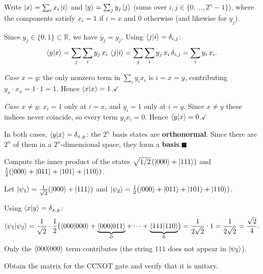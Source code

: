\documentclass{ceri/sty/rapport}
\newcounter{exercice}[section]
\begin{document}
\begin{solution}
Write $\ket{x}=\sum_{i}x_i\ket{i}$ and $\ket{y}=\sum_{j}y_j\ket{j}$
(sums over $i,j\in\{0,\ldots,2^n-1\}$),
where the components satisfy $x_i=1$ if $i=x$ and $0$ otherwise (and likewise for $y_j$).

Since $y_j\in\{0,1\}\subset\mathbb{R}$, we have $\bar{y}_j=y_j$.
Using $\braket{j|i}=\delta_{i,j}$:
\[
  \braket{y|x}
  =\sum_{j}\sum_{i}y_j\,x_i\,\braket{j|i}
  =\sum_{j}\sum_{i}y_j\,x_i\,\delta_{i,j}
  =\sum_{i}y_i\,x_i.
\]

\textit{Case $x=y$}: the only nonzero term in $\sum_i y_i x_i$ is $i=x=y$,
contributing $y_x\cdot x_x=1\cdot 1=1$.
Hence $\braket{x|x}=1$.\quad$\checkmark$

\textit{Case $x\neq y$}: $x_i=1$ only at $i=x$, and $y_i=1$ only at $i=y$.
Since $x\neq y$ these indices never coincide, so every term $y_i x_i=0$.
Hence $\braket{y|x}=0$.\quad$\checkmark$

In both cases, $\braket{y|x}=\delta_{x,y}$: the $2^n$ basis states are \textbf{orthonormal}.
Since there are $2^n$ of them in a $2^n$-dimensional space, they form a \textbf{basis}.\quad$\blacksquare$
\end{solution}

\begin{exercice}[p.~39]
Compute the inner product of the states
$\sqrt{1/2}\,(\ket{000}+\ket{111})$ and
$\tfrac{1}{2}(\ket{000}+\ket{011}+\ket{101}+\ket{110})$.
\end{exercice}

\begin{solution}
Let $\ket{\psi_1}=\tfrac{1}{\sqrt{2}}(\ket{000}+\ket{111})$ and
$\ket{\psi_2}=\tfrac{1}{2}(\ket{000}+\ket{011}+\ket{101}+\ket{110})$.

Using $\braket{x|y}=\delta_{x,y}$:
\[
  \braket{\psi_1|\psi_2}
  =\frac{1}{\sqrt{2}}\cdot\frac{1}{2}\bigl(\braket{000|000}+\underbrace{\braket{000|011}}_{0}
    +\cdots+\underbrace{\braket{111|110}}_{0}\bigr)
  =\frac{1}{2\sqrt{2}}\cdot 1 = \frac{1}{2\sqrt{2}}=\frac{\sqrt{2}}{4}.
\]
Only the $\braket{000|000}$ term contributes (the string $111$ does not appear in $\ket{\psi_2}$).
\end{solution}

\begin{exercice}[p.~40]
Obtain the matrix for the CCNOT gate and verify that it is unitary.
\end{exercice}
\end{document}
